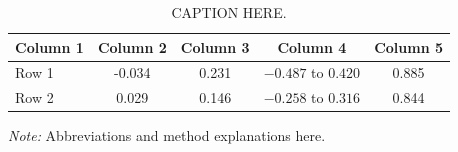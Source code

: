%
%   
%

\begin{table}[htbp]
\centering
\caption{CAPTION HERE.}
\label{tab:LABEL-HERE}
\begin{tabular}{l S[table-format=-1.3] S[table-format=1.3] c S[table-format=1.3]}
\toprule
{Column 1} & {Column 2} & {Column 3} & {Column 4} & {Column 5} \\
\midrule
Row 1 & -0.034 & 0.231 & $-0.487$ to $0.420$ & 0.885 \\
Row 2 &  0.029 & 0.146 & $-0.258$ to $0.316$ & 0.844 \\
\bottomrule
\end{tabular}

\smallskip
\noindent\textit{Note:} Abbreviations and method explanations here.
\end{table}
